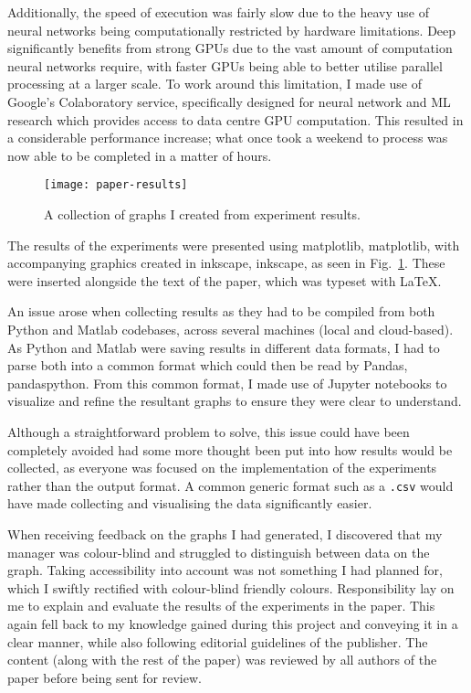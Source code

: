Additionally, the speed of execution was fairly slow due to the heavy use of neural networks being
computationally restricted by hardware limitations. Deep  significantly benefits from
strong GPUs due to the vast amount of computation neural networks require, with faster GPUs being
able to better utilise parallel processing at a larger scale. To work around this limitation, I made
use of Google's Colaboratory service, specifically designed for neural network and ML research which
provides access to data centre GPU computation. This resulted in a considerable performance
increase; what once took a weekend to process was now able to be completed in a matter of hours.

\begin{figure}
    \centering
    \texttt{[image: paper-results]}
    \caption{A collection of graphs I created from experiment results.\label{fig:paper-figures}}
\end{figure}

The results of the experiments were presented using \gls*{matplotlib}, \glsdesc*{matplotlib}, with
accompanying graphics created in \gls*{inkscape}, \glsdesc*{inkscape}, as seen in
Fig.~\ref{fig:paper-figures}. These were inserted alongside the text of the paper, which was typeset
with \LaTeX.

An issue arose when collecting results as they had to be compiled from both Python and Matlab
codebases, across several machines (local and cloud-based). As Python and Matlab were saving results
in different data formats, I had to parse both into a common format which could then be read by
Pandas, \glsdesc*{pandaspython}. From this common format, I made use of Jupyter notebooks to
visualize and refine the resultant graphs to ensure they were clear to understand.

Although a straightforward problem to solve, this issue could have been completely avoided had some
more thought been put into how results would be collected, as everyone was focused on the
implementation of the experiments rather than the output format. A common generic format such as a
\texttt{.csv} would have made collecting and visualising the data significantly easier.

When receiving feedback on the graphs I had generated, I discovered that my manager was colour-blind
and struggled to distinguish between data on the graph. Taking accessibility into account was not
something I had planned for, which I swiftly rectified with colour-blind friendly colours.
Responsibility lay on me to explain and evaluate the results of the experiments in the paper. This
again fell back to my knowledge gained during this project and conveying it in a clear manner, while
also following editorial guidelines of the publisher. The content (along with the rest of the
paper) was reviewed by all authors of the paper before being sent for review.

